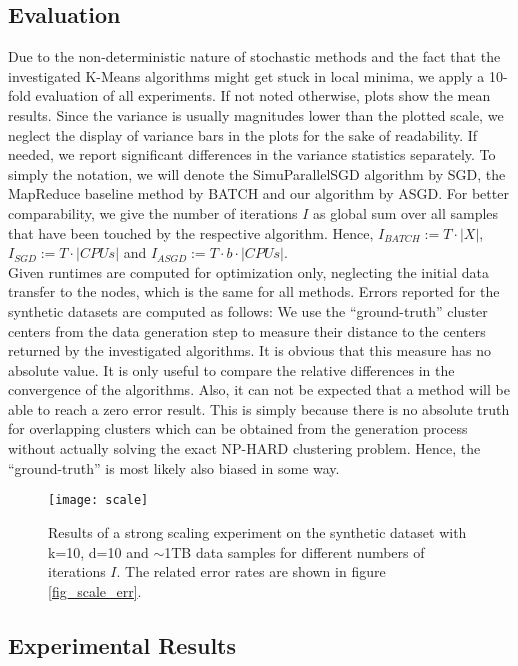 \documentclass{acm_proc_article-sp}
\begin{document}
\subsection{Evaluation}
Due to the non-deterministic nature of stochastic methods and the fact that 
the investigated K-Means algorithms might get stuck in local minima, we  
apply a 10-fold evaluation of all experiments. If not noted otherwise, plots
show the mean results. Since the variance is usually magnitudes lower than
the plotted scale, we neglect the display of variance bars in the plots for the 
sake of readability. If needed, we report significant differences in the variance
statistics separately. To simply the notation, we will denote the SimuParallelSGD \cite{SGDsmola}
algorithm by SGD, the MapReduce baseline method \cite{chu2007map} by BATCH and
our algorithm by ASGD.   
For better comparability, we give the number of iterations $I$
as global sum over all samples that have been touched by the respective algorithm.
Hence, $I_{BATCH}:=T\cdot|X|$, $I_{SGD}:=T\cdot|CPUs|$ and 
$I_{ASGD}:=T\cdot b\cdot|CPUs|$.\\ 
Given runtimes are computed for optimization only, neglecting the initial data transfer
to the nodes, which is the same for all methods.       
Errors reported for the synthetic datasets are computed as follows: We use the
``ground-truth'' cluster centers from the data generation step to measure their
distance to the centers returned by the investigated algorithms. It is obvious
that this measure has no absolute value. It is only useful to compare the relative
differences in the convergence of the algorithms. Also, it can not be expected that
a method will be able to reach a zero error result. This is simply because 
there is no absolute truth for 
overlapping clusters which can be obtained from the generation process without
actually solving the exact NP-HARD clustering problem. Hence, the ``ground-truth''
is most likely also biased in some way.       


\begin{figure}[!t]
\texttt{[image: scale]}
\caption{Results of a strong scaling experiment on the synthetic dataset
with k=10, d=10 and $\sim$1TB data samples for different numbers of 
iterations $I$. The related error rates are shown in figure 
\ref{fig_scale_err}.
\label{fig_eval_scaling}}
\end{figure}
\subsection{Experimental Results}
\end{document}
